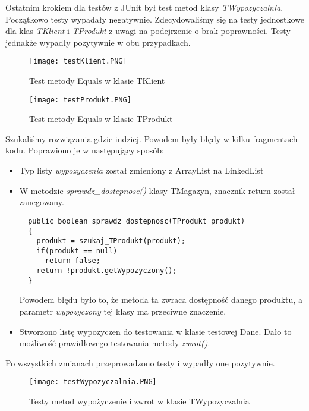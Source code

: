\documentclass{article}
\begin{document}
Ostatnim krokiem dla testów z JUnit był test metod klasy \textit{TWypozyczalnia}. Początkowo testy wypadały negatywnie. Zdecydowaliśmy się na testy jednostkowe dla klas \textit{TKlient} i \textit{TProdukt} z uwagi na podejrzenie o brak poprawności. Testy jednakże wypadły pozytywnie w obu przypadkach. 
\begin{figure}[!ht]
\centering
\texttt{[image: testKlient.PNG]}
\caption{Test metody Equals w klasie TKlient}
\end{figure}
\newpage
\begin{figure}[!ht]
\centering
\texttt{[image: testProdukt.PNG]}
\caption{Test metody Equals w klasie TProdukt}
\end{figure}
Szukaliśmy rozwiązania gdzie indziej. Powodem były błędy w kilku fragmentach kodu. Poprawiono je w następujący sposób:
\begin{itemize}
\item Typ listy \textit{wypozyczenia} został zmieniony z ArrayList na LinkedList
\item W metodzie \textit{sprawdz\_dostepnosc()} klasy TMagazyn, znacznik return został zanegowany.
\begin{verbatim}
  public boolean sprawdz_dostepnosc(TProdukt produkt)
  {
    produkt = szukaj_TProdukt(produkt);
    if(produkt == null)
      return false;
    return !produkt.getWypozyczony();
  }
\end{verbatim} 
Powodem błędu było to, że metoda ta zwraca dostępność danego produktu, a parametr \textit{wypozyczony} tej klasy ma przeciwne znaczenie.
\item Stworzono listę wypozyczen do testowania w klasie testowej Dane. Dało to możliwość prawidłowego testowania metody \textit{zwrot()}.
\end{itemize}
Po wszystkich zmianach przeprowadzono testy i wypadły one pozytywnie.
\begin{figure}[!ht]
\centering
\texttt{[image: testWypozyczalnia.PNG]}
\caption{Testy metod wypożyczenie i zwrot w klasie TWypozyczalnia}
\end{figure}
\end{document}
